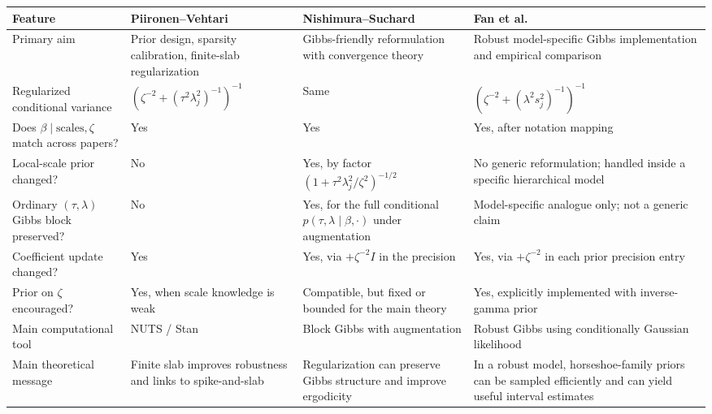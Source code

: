 \documentclass[11pt]{article}
\begin{document}
\begin{center}
\renewcommand{\arraystretch}{1.25}
\begin{tabular}{>{\raggedright\arraybackslash}p{} >{\raggedright\arraybackslash}p{} >{\raggedright\arraybackslash}p{} >{\raggedright\arraybackslash}p{}}
\toprule
Feature & Piironen--Vehtari & Nishimura--Suchard & Fan et al. \\
\midrule
Primary aim & Prior design, sparsity calibration, finite-slab regularization & Gibbs-friendly reformulation with convergence theory & Robust model-specific Gibbs implementation and empirical comparison \\
\addlinespace
Regularized conditional variance &
$\left(\zeta^{-2}+(\tau^2\lambda_j^2)^{-1}\right)^{-1}$ &
Same &
$\left(\zeta^{-2}+(\lambda^2 s_j^2)^{-1}\right)^{-1}$ \\
\addlinespace
Does $\beta \mid \text{scales},\zeta$ match across papers? &
Yes &
Yes &
Yes, after notation mapping \\
\addlinespace
Local-scale prior changed? &
No &
Yes, by factor $(1+\tau^2\lambda_j^2/\zeta^2)^{-1/2}$ &
No generic reformulation; handled inside a specific hierarchical model \\
\addlinespace
Ordinary $(\tau,\lambda)$ Gibbs block preserved? &
No &
Yes, for the full conditional $p(\tau,\lambda\mid\beta,\cdot)$ under augmentation &
Model-specific analogue only; not a generic claim \\
\addlinespace
Coefficient update changed? &
Yes &
Yes, via $+\zeta^{-2}I$ in the precision &
Yes, via $+\zeta^{-2}$ in each prior precision entry \\
\addlinespace
Prior on $\zeta$ encouraged? &
Yes, when scale knowledge is weak &
Compatible, but fixed or bounded for the main theory &
Yes, explicitly implemented with inverse-gamma prior \\
\addlinespace
Main computational tool &
NUTS / Stan &
Block Gibbs with augmentation & Robust Gibbs using conditionally Gaussian likelihood \\
\addlinespace
Main theoretical message &
Finite slab improves robustness and links to spike-and-slab &
Regularization can preserve Gibbs structure and improve ergodicity &
In a robust model, horseshoe-family priors can be sampled efficiently and can yield useful interval estimates \\
\bottomrule
\end{tabular}
\end{center}
\end{document}
